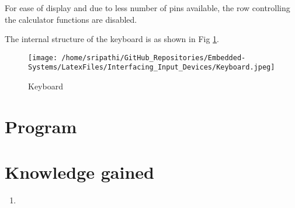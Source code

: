 \documentclass[12pt, letterpaper]{article}
\begin{document}
For ease of display and due to less number of pins available, the row controlling the calculator functions are disabled. 

The internal structure of the keyboard is as shown in Fig \ref{fig:keyboard}.

\begin{figure}[!h]
	\centering
	\texttt{[image: /home/sripathi/GitHub\_Repositories/Embedded-Systems/LatexFiles/Interfacing\_Input\_Devices/Keyboard.jpeg]}
	\caption{Keyboard}
	\label{fig:keyboard}
\end{figure}

\section{Program}

\section{Knowledge gained}

\begin{enumerate}
	\item 
\end{enumerate}
\end{document}

